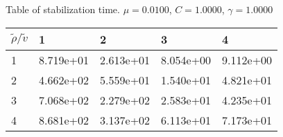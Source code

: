 \begin{center}
	Table of stabilization time. $\mu = 0.0100$, $C = 1.0000$, $\gamma = 1.0000$
	
	\begin{tabular}{|p{0.8in}|p{0.8in}|p{0.8in}|p{0.8in}|p{0.8in}|} \hline
		$\tilde{\rho} / \tilde{v}$ &1 &2 &3 &4 \\ \hline 
		1 &8.719e+01 &2.613e+01 &8.054e+00 &9.112e+00 \\ \hline 
		2 &4.662e+02 &5.559e+01 &1.540e+01 &4.821e+01 \\ \hline 
		3 &7.068e+02 &2.279e+02 &2.583e+01 &4.235e+01 \\ \hline 
		4 &8.681e+02 &3.137e+02 &6.113e+01 &7.173e+01 \\ \hline 
		
	\end{tabular}\\[20pt]
\end{center}

